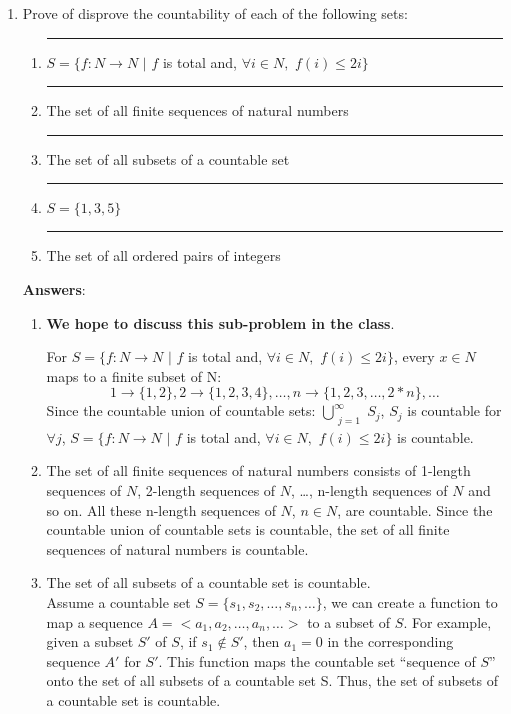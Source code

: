\documentclass{article}%
\begin{document}
\begin{enumerate}
	\item Prove of disprove the countability of each of the following sets:	
	\begin{enumerate}
		\item \rule{0.5 in}{1 pt} $S= \{f: N \to N$ $|$ $f$ is total and, $\forall i \in N,$ $f(i) \leq 2i \}$
		\item \rule{0.5 in}{1 pt} The set of all finite sequences of natural numbers
		\item \rule{0.5 in}{1 pt} The set of all subsets of a countable set
		\item \rule{0.5 in}{1 pt} $S= \{1,3,5\}$
		\item \rule{0.5 in}{1 pt} The set of all ordered pairs of integers
	\end{enumerate}
  
  \textbf{Answers}:
  
  \begin{enumerate}
		\item \textbf{We hope to discuss this sub-problem in the class}.
		
		For $S= \{f: N \to N$ $|$ $f$ is total and, $\forall i \in N,$ $f(i) \leq 2i \}$, every $x \in N$ maps to a finite subset of N: $$1 \rightarrow \{1,2\}, 2 \rightarrow \{1,2,3,4\}, \ldots, n \rightarrow \{1,2,3,\ldots,2*n\}, \ldots$$
		Since the countable union of countable sets: $\bigcup_{\substack{j=1}}^{\infty} S_{j}$, $S_{j}$ is countable for $\forall j$, $S= \{f: N \to N$ $|$ $f$ is total and, $\forall i \in N,$ $f(i) \leq 2i \}$ is countable.
		
		\item The set of all finite sequences of natural numbers consists of 1-length sequences of $N$, 2-length sequences of $N$, \ldots, n-length sequences of $N$ and so on. All these n-length sequences of $N$, $n \in N$, are countable. Since the countable union of countable sets is countable, the set of all finite sequences of natural numbers is countable.
		
		\item The set of all subsets of a countable set is countable. \\ Assume a countable set $S=\{s_{1},s_{2},\ldots,s_{n},\ldots\}$, we can create a function to map a sequence $A = <a_{1},a_{2},\ldots,a_{n},\ldots>$ to a subset of $S$. For example, given a subset $S'$ of $S$, if $s_{1} \notin S'$, then $a_{1} = 0$ in the corresponding sequence $A'$ for $S'$. This function maps the countable set ``sequence of $S$''  onto the set of all subsets of a countable set S. Thus, the set of subsets of a countable set is countable.
		

\end{enumerate}
\end{enumerate}
\end{document}
